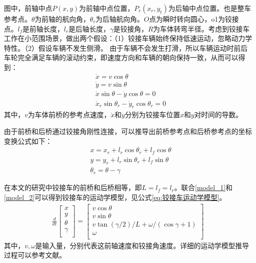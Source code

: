 \documentclass[master,academic]{ysuthesis} %
\begin{document}
	图中，前轴中点$P(x,y)$为前轴中点位置，$P_r(x_r,y_t)$为后轴中点位置。也是整车参考点。$\theta$为前轴的航向角，$\theta_r$为后轴航向角。$O$点为瞬时转向圆心，o1为铰接点。$l_f$是前轴长度，$l_r$是后轴长度，$\gamma$是铰接角，$R$为车体转弯半径。考虑到铰接车工作在小范围场景，做出两个假设：（1）铰接车辆始终保持低速运动，忽略动力学特性。（2）假设车辆不发生侧滑。
	由于车辆不会发生打滑，所以车辆运动时前后车轮完全满足车辆的滚动约束，即速度方向和车辆的朝向保持一致，从而可以得到：
	\begin{equation}
		\begin{aligned}
			&\dot{x}=v\cos\theta\\
			&\dot{y}=v\sin\theta\\
			&\dot{x}\sin\theta-\dot{y}\cos\theta=0\\
			&\dot{x}_r\sin\theta _r-\dot{y}_r\cos\theta _r=0
		\end{aligned}
		\label{model_1}
	\end{equation}
	其中，$v$为车体前桥的参考点速度，$\dot{x}$和$\dot{y}$分别为铰接车位置$x$和$y$对时间的导数。

	由于前桥和后桥通过铰接角刚性连接，可以推导出前桥参考点和后桥参考点的坐标变换公式如下：
	\begin{equation}
		\begin{aligned}
			&x=x_r+l_r\cos\theta _r+l_f\cos\theta\\
			&y=y_r+l_r\sin\theta _r+l_f\sin\theta\\
			&\theta _r=\theta-\gamma 
		\end{aligned}
		\label{model_2}
	\end{equation}

	在本文的研究中铰接车的前桥和后桥相等，即$L=l_f=l_r$。联合\ref{model_1}和\ref{model_2}可以得到铰接车的运动学模型，见公式\ref{eq:铰接车运动学模型}。
	\begin{equation}
		\begin{aligned}
			\frac{d}{dt}\left[ \begin{array}{c}
				x\\
				y\\
				\theta\\
				\gamma\\
			\end{array} \right] =\left[ \begin{array}{c}
				v\cos\theta\\
				v\sin\theta\\
				v\tan( \gamma /2 ) /L+\omega /( \cos\gamma +1 )\\
				\omega\\
			\end{array} \right] 
		\end{aligned}
		\label{eq:铰接车运动学模型}
	\end{equation}
	其中，$v,\omega$是输入量，分别代表这前轴速度和铰接角速度。详细的运动学模型推导过程可以参考文献\cite{corke2001steering}。
\end{document}
